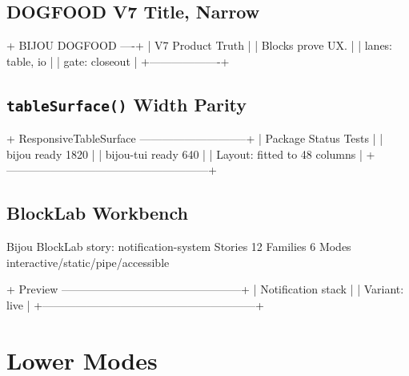\subsection{DOGFOOD V7 Title, Narrow}\label{record-101-dogfood-v7-title-narrow}

\begin{CodeBlock}
+ BIJOU DOGFOOD ----+
| V7 Product Truth  |
| Blocks prove UX.  |
| lanes: table, io  |
| gate: closeout    |
+-------------------+
\end{CodeBlock}

\subsection{\texorpdfstring{\texttt{t\allowbreak{}a\allowbreak{}b\allowbreak{}l\allowbreak{}e\allowbreak{}S\allowbreak{}u\allowbreak{}r\allowbreak{}f\allowbreak{}a\allowbreak{}c\allowbreak{}e\allowbreak{}(\allowbreak{})} Width Parity}{ Width Parity}}\label{record-101-tablesurface-width-parity}

\begin{CodeBlock}
+ ResponsiveTableSurface -----------------------------+
| Package     Status   Tests                           |
| bijou       ready    1820                            |
| bijou-tui   ready    640                             |
| Layout: fitted to 48 columns                         |
+------------------------------------------------------+
\end{CodeBlock}

\subsection{BlockLab Workbench}\label{record-101-blocklab-workbench}

\begin{CodeBlock}
Bijou BlockLab                         story: notification-system
Stories 12  Families 6  Modes interactive/static/pipe/accessible

+ Preview ------------------------------------------------+
| Notification stack                                      |
| Variant: live                                           |
+---------------------------------------------------------+
\end{CodeBlock}

\section{Lower Modes}\label{record-101-lower-modes}

